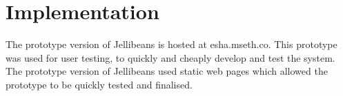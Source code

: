 \documentclass[a4paper, 11pt]{article}
\begin{document}

\section{Implementation}
The prototype version of Jellibeans is hosted at esha.mseth.co. This prototype was used for user testing, to quickly and cheaply develop and test the system. The prototype version of Jellibeans used static web pages which allowed the prototype to be quickly tested and finalised.
\end{document}
